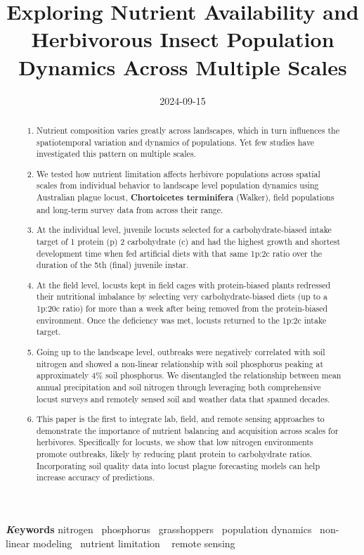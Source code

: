 \documentclass[
]{article}
\title{Exploring Nutrient Availability and Herbivorous Insect Population
Dynamics Across Multiple Scales}
\author{\asep\asep\asep\asep\asep\asep\asep\asep\asep}
\date{2024-09-15}
\begin{document}
\maketitle
\begin{abstract}
\begin{enumerate}
\def\labelenumi{\arabic{enumi}.}
\item
  Nutrient composition varies greatly across landscapes, which in turn
  influences the spatiotemporal variation and dynamics of populations.
  Yet few studies have investigated this pattern on multiple scales.
\item
  We tested how nutrient limitation affects herbivore populations across
  spatial scales from individual behavior to landscape level population
  dynamics using Australian plague locust, \textbf{Chortoicetes
  terminifera} (Walker), field populations and long-term survey data
  from across their range.
\item
  At the individual level, juvenile locusts selected for a
  carbohydrate-biased intake target of 1 protein (p) 2 carbohydrate (c)
  and had the highest growth and shortest development time when fed
  artificial diets with that same 1p:2c ratio over the duration of the
  5th (final) juvenile instar.
\item
  At the field level, locusts kept in field cages with protein-biased
  plants redressed their nutritional imbalance by selecting very
  carbohydrate-biased diets (up to a 1p:20c ratio) for more than a week
  after being removed from the protein-biased environment. Once the
  deficiency was met, locusts returned to the 1p:2c intake target.
\item
  Going up to the landscape level, outbreaks were negatively correlated
  with soil nitrogen and showed a non-linear relationship with soil
  phosphorus peaking at approximately 4\% soil phosphorus. We
  disentangled the relationship between mean annual precipitation and
  soil nitrogen through leveraging both comprehensive locust surveys and
  remotely sensed soil and weather data that spanned decades.
\item
  This paper is the first to integrate lab, field, and remote sensing
  approaches to demonstrate the importance of nutrient balancing and
  acquisition across scales for herbivores. Specifically for locusts, we
  show that low nitrogen environments promote outbreaks, likely by
  reducing plant protein to carbohydrate ratios. Incorporating soil
  quality data into locust plague forecasting models can help increase
  accuracy of predictions.
\end{enumerate}
\end{abstract}
{\bfseries \emph Keywords}
\def\sep{\textbullet\ }
nitrogen \sep phosphorus \sep grasshoppers \sep population
dynamics \sep non-linear modeling \sep nutrient limitation \sep 
remote sensing
\end{document}
